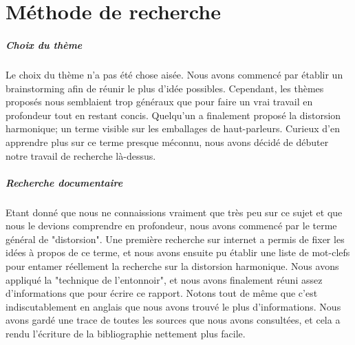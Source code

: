 \appendix
\chapter{Méthode de recherche}

\paragraph{Choix du thème}
Le choix du thème n'a pas été chose aisée. Nous avons commencé par établir un brainstorming afin de réunir le plus d'idée possibles.
Cependant, les thèmes proposés nous semblaient trop généraux que pour faire un vrai travail en profondeur tout en restant concis.
Quelqu'un a finalement proposé la distorsion harmonique; un terme visible sur les emballages de haut-parleurs.
Curieux d'en apprendre plus sur ce terme presque méconnu, nous avons décidé de débuter notre travail de recherche là-dessus.


\paragraph{Recherche documentaire}
Etant donné que nous ne connaissions vraiment que très peu sur ce sujet et que nous 
le devions comprendre en profondeur, nous avons commencé par le terme général de "distorsion".
Une première recherche sur internet a permis de fixer les idées à propos de ce terme, et nous 
avons ensuite pu établir une liste de mot-clefs pour entamer réellement la recherche sur la 
distorsion harmonique. Nous avons appliqué la "technique de l'entonnoir", et nous avons finalement 
réuni assez d'informations que pour écrire ce rapport. Notons tout de même que c'est indiscutablement en anglais que nous avons 
trouvé le plus d'informations. Nous avons gardé une trace de toutes les sources que nous avons 
consultées, et cela a rendu l'écriture de la bibliographie nettement plus facile.

\clearpage


\nocite{*}






